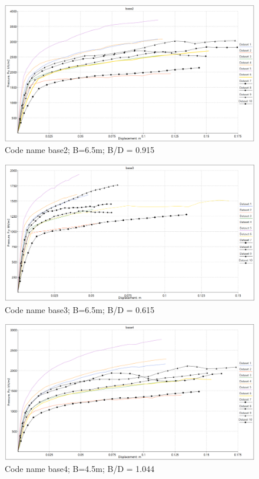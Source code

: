 \documentclass[a4paper, nobind]{templates/ociamthesis}
\begin{document}
\begin{figure}[H]
\includegraphics[width=1\linewidth]{myfigureeeeee/BASE2} \caption{Code name base2; B=6.5m; B/D = 0.915}\label{fig:unnamed-chunk-38}
\end{figure}

\begin{figure}[H]
\includegraphics[width=1\linewidth]{myfigureeeeee/BASE3} \caption{Code name base3; B=6.5m; B/D = 0.615}\label{fig:unnamed-chunk-39}
\end{figure}

\begin{figure}[H]
\includegraphics[width=1\linewidth]{myfigureeeeee/BASE4} \caption{Code name base4; B=4.5m; B/D = 1.044}\label{fig:unnamed-chunk-40}
\end{figure}
\end{document}
